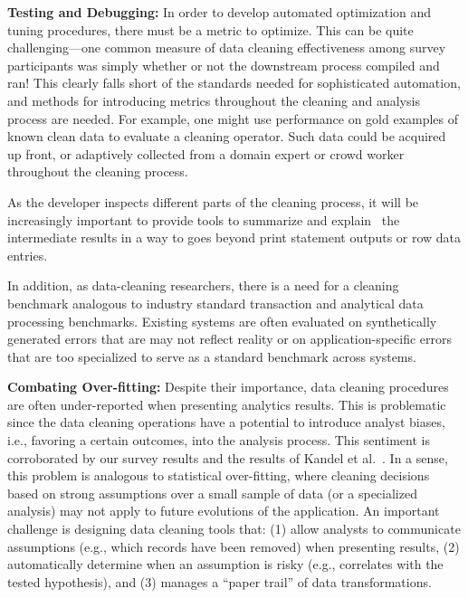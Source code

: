 \vspace{0.5em}
\noindent\textbf{Testing and Debugging:} In order to develop automated optimization and tuning procedures, there must be a metric to optimize.  This can be quite challenging---one common measure of data cleaning effectiveness among survey participants was simply whether or not the downstream process compiled and ran!
This clearly falls short of the standards needed for sophisticated automation, and methods for introducing metrics throughout the cleaning and analysis process are needed.
For example, one might use performance on gold examples of known clean data to evaluate a cleaning operator.
Such data could be acquired up front, or adaptively collected from a domain expert or crowd worker throughout the cleaning process.

As the developer inspects different parts of the cleaning process, it will be increasingly important to provide tools to summarize and explain~\cite{DBLP:journals/pvldb/0002M13,DBLP:conf/sigmod/ChalamallaIOP14,wang2016qfix} the intermediate results in a way to goes beyond print statement outputs or row data entries.

In addition, as data-cleaning researchers, there is a need for a cleaning benchmark analogous to industry standard transaction and analytical data processing benchmarks.
Existing systems are often evaluated on synthetically generated errors that are may not reflect reality or on application-specific errors that are too specialized to serve as a standard benchmark across systems.

\vspace{0.5em}
\noindent\textbf{Combating Over-fitting:}
Despite their importance, data cleaning procedures are often under-reported
when presenting analytics results. This is problematic since the data
cleaning operations have a potential to introduce analyst biases,
i.e., favoring a certain outcomes, into the analysis process.
This sentiment is corroborated by our survey results and the results of Kandel et al.~\cite{kandel2012}.
In a sense, this problem is analogous to statistical over-fitting, where cleaning decisions based on strong assumptions over a small sample of data (or a specialized analysis) may not apply to future evolutions of the application.
An important challenge is designing data cleaning tools that: (1) allow analysts to communicate assumptions (e.g., which records have been removed) when presenting results, (2) automatically determine when an assumption is risky (e.g., correlates with the tested hypothesis), and (3) manages a ``paper trail'' of data transformations.


